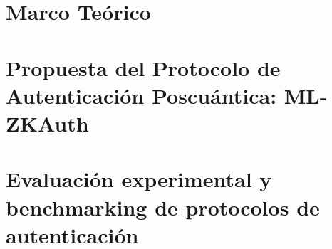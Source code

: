 \documentclass[12pt, letterpaper, oneside]{article}
\begin{document}



\cleardoublepage
\tableofcontents %

\cleardoublepage
\listoffigures %

\cleardoublepage
\listoftables %

\cleardoublepage



\section{Marco Teórico}







\section{Propuesta del Protocolo de Autenticación Poscuántica: ML-ZKAuth}



\section{Evaluación experimental y benchmarking de protocolos de autenticación}













\newpage


\end{document}
